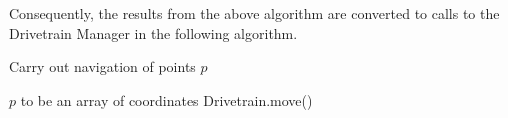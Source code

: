 \documentclass{article}
\begin{document}
Consequently, the results from the above algorithm are converted to calls to the Drivetrain Manager in the following algorithm.

\begin{algorithm}[H]
	\caption{Carry out navigation of points $p$}
	\begin{algorithmic}[1]
		\Require $p$ to be an array of coordinates
			\For{$i$ \textbf{in} $[1,\#p)$} 
				\State Drivetrain.move()
			\EndFor
		\EndProcedure
	\end{algorithmic}
\end{algorithm}
			
\end{document}

